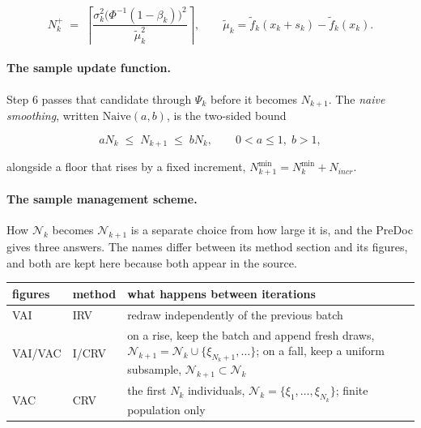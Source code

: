 \documentclass[11pt,a4paper]{article}
\newcommand{\VAI}{\textsf{VAI}}
\newcommand{\VAIVAC}{\textsf{VAI/VAC}}
\newcommand{\VAC}{\textsf{VAC}}
\begin{document}
\begin{equation}
  N_k^{+} \;=\; \left\lceil
      \frac{\sigma_k^2 \bigl(\Phi^{-1}(1-\beta_k)\bigr)^2}{\tilde\mu_k^2}
  \right\rceil,
  \qquad \tilde\mu_k = \tilde f_k(x_k + s_k) - \tilde f_k(x_k).
  \label{eq:step5}
\end{equation}

\paragraph{The sample update function.} Step 6 passes that candidate through
$\Psi_k$ before it becomes $N_{k+1}$. The \emph{naive smoothing}, written
$\mathrm{Naive}(a,b)$, is the two-sided bound

\begin{equation}
  a N_k \;\le\; N_{k+1} \;\le\; b N_k, \qquad 0 < a \le 1,\; b > 1,
  \label{eq:naive}
\end{equation}

alongside a floor that rises by a fixed increment,
$N^{\min}_{k+1} = N^{\min}_{k} + N_{incr}$.

\paragraph{The sample management scheme.} How $\mathcal{N}_k$ becomes
$\mathcal{N}_{k+1}$ is a separate choice from how large it is, and the PreDoc gives
three answers. The names differ between its method section and its figures, and
both are kept here because both appear in the source.

\begin{center}
\begin{tabular}{llp{8.4cm}}
\toprule
figures & method & what happens between iterations \\
\midrule
\VAI{}    & IRV   & redraw independently of the previous batch \\
\VAIVAC{} & I/CRV & on a rise, keep the batch and append fresh draws,
                    $\mathcal{N}_{k+1} = \mathcal{N}_k \cup \{\xi_{N_k+1},\dots\}$;
                    on a fall, keep a uniform subsample,
                    $\mathcal{N}_{k+1} \subset \mathcal{N}_k$ \\
\VAC{}    & CRV   & the first $N_k$ individuals,
                    $\mathcal{N}_k = \{\xi_1,\dots,\xi_{N_k}\}$; finite population only \\
\bottomrule
\end{tabular}
\end{center}
\end{document}
